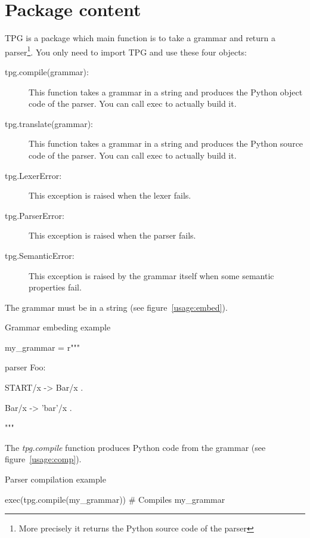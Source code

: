 \section{Package content}

TPG is a package which main function is to take a grammar and return a parser\footnote{More precisely it returns the Python source code of the parser}.
You only need to import TPG and use these four objects:

\begin{description}
	\item [tpg.compile(grammar):]
		This function takes a grammar in a string and produces
		the Python object code of the parser.
		You can call exec to actually build it.
	\item [tpg.translate(grammar):]
		This function takes a grammar in a string and produces
		the Python source code of the parser.
		You can call exec to actually build it.
	\item [tpg.LexerError:]
		This exception is raised when the lexer fails.
	\item [tpg.ParserError:]
		This exception is raised when the parser fails.
	\item [tpg.SemanticError:]
		This exception is raised by the grammar itself
		when some semantic properties fail.
\end{description}

The grammar must be in a string (see figure~\ref{usage:embed}).

\begin{code}
\caption{Grammar embeding example}							\label{usage:embed}
\begin{verbatimtab}[4]
	my_grammar = r"""

	parser Foo:

		START/x -> Bar/x .

		Bar/x -> 'bar'/x .

	"""
\end{verbatimtab}
\end{code}

The \emph{tpg.compile} function produces Python code from the grammar (see figure~\ref{usage:comp}).

\begin{code}
\caption{Parser compilation example}						\label{usage:comp}
\begin{verbatimtab}[4]
	exec(tpg.compile(my_grammar))    # Compiles my_grammar
\end{verbatimtab}
\end{code}

